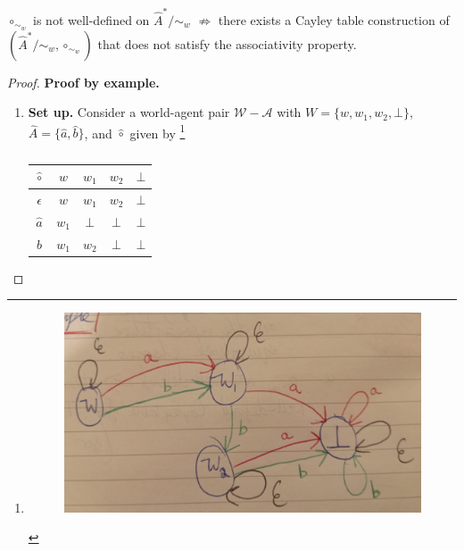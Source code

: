 \begin{proposition}\label{prp:circ_sim_w_not_well_defined_does_not_mean_no_associativity}
    $\circ_{\sim_{w}}$ is not well-defined on $\hat{A}^{*}/\sim_{w}$ $\nRightarrow$ there exists a Cayley table construction of $(\hat{A}^{*}/\sim_{w}, \circ_{\sim_{w}})$ that does not satisfy the associativity property.
\end{proposition}
\begin{proof}
\textbf{Proof by example.}
\begin{enumerate}[(1)]
    \item \textbf{Set up.}
    Consider a world-agent pair $\mathscr{W}-\mathscr{A}$ with $W = \{ w, w_{1}, w_{2}, \bot \}$, $\hat{A} = \{\hat{a}, \hat{b}\}$, and $\hat{\circ}$ given by
    \footnote{\begin{figure}[H]
        \includegraphics[width=0.5\linewidth]{5BeyondSBDRL/LocalAlgebras/Images/circ_sim_w_not_well_defined_does_not_mean_no_associativity_counter_example.jpeg}
        \caption{
        }
    \end{figure}}
    \begin{table}[H]
        \centering
        \begin{tabular}{c|cccc}
            $\hat{\circ}$   & $w$       & $w_{1}$   & $w_{2}$   & $\bot$ \\
            \hline
            $\epsilon$      & $w$       & $w_{1}$   & $w_{2}$   & $\bot$ \\
            $\hat{a}$       & $w_{1}$   & $\bot$   & $\bot$   & $\bot$ \\
            $\hat{b}$       & $w_{1}$   & $w_{2}$   & $\bot$   & $\bot$
        \end{tabular}
        \caption{
        }
    \end{table}


\end{enumerate}
\end{proof}

